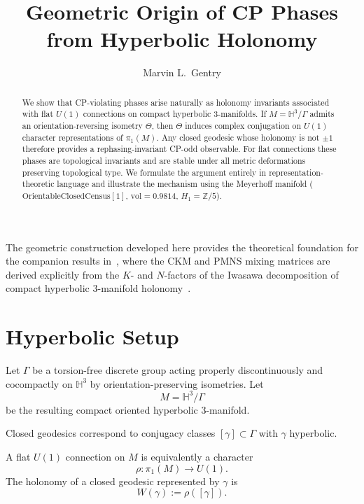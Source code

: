 \documentclass[12pt]{article}
\title{Geometric Origin of CP Phases from Hyperbolic Holonomy}
\author[1]{Marvin L.\ Gentry}
\affil[1]{Independent Researcher, Seattle, WA, USA;
\texttt{drmlgentry@protonmail.com};
ORCID: 0009-0006-4550-2663}
\date{}
\begin{document}
\maketitle

\begin{abstract}
We show that CP-violating phases arise naturally as holonomy invariants
associated with flat $U(1)$ connections on compact hyperbolic $3$-manifolds.
If $M = \mathbb{H}^3/\Gamma$ admits an orientation-reversing isometry $\Theta$,
then $\Theta$ induces complex conjugation on $U(1)$ character representations
of $\pi_1(M)$. Any closed geodesic whose holonomy is not $\pm 1$
therefore provides a rephasing-invariant CP-odd observable.
For flat connections these phases are topological invariants and
are stable under all metric deformations preserving topological type.
We formulate the argument entirely in representation-theoretic language
and illustrate the mechanism using the Meyerhoff manifold ($\mathrm{OrientableClosedCensus}[1]$, $\mathrm{vol}=0.9814$, $H_1=\mathbb{Z}/5$).
\end{abstract}

The geometric construction developed here provides the theoretical
foundation for the companion results in~\cite{Gentry:CKM,Gentry:PMNS},
where the CKM and PMNS mixing matrices are derived explicitly from the
$K$- and $N$-factors of the Iwasawa decomposition of compact hyperbolic
3-manifold holonomy~\cite{Gentry:CKM,Gentry:PMNS}.

\section{Hyperbolic Setup}

Let $\Gamma$ be a torsion-free discrete group acting properly discontinuously
and cocompactly on $\mathbb{H}^3$ by orientation-preserving isometries.
Let
\[
M = \mathbb{H}^3/\Gamma
\]
be the resulting compact oriented hyperbolic $3$-manifold.

Closed geodesics correspond to conjugacy classes
$[\gamma] \subset \Gamma$ with $\gamma$ hyperbolic.

\begin{definition}
A flat $U(1)$ connection on $M$ is equivalently a character
\[
\rho : \pi_1(M) \longrightarrow U(1).
\]
The holonomy of a closed geodesic represented by $\gamma$
is
\[
W(\gamma) := \rho([\gamma]).
\]
\end{definition}
\end{document}
